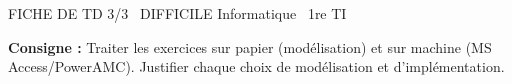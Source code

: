 \documentclass[11pt]{article}
\begin{document}
\begin{tcolorbox}[enhanced,colback=popink,colframe=popink,arc=10pt,boxrule=0pt,left=12pt,right=12pt,top=9pt,bottom=9pt]
{\color{white}\popxbold\small FICHE DE TD 3/3 \textbullet\ DIFFICILE \hfill Informatique \textbullet\ 1re TI\par}
\end{tcolorbox}
\vspace{4pt}
\noindent\textbf{Consigne :} Traiter les exercices sur papier (modélisation) et sur machine (MS Access/PowerAMC). Justifier chaque choix de modélisation et d'implémentation.
\end{document}
